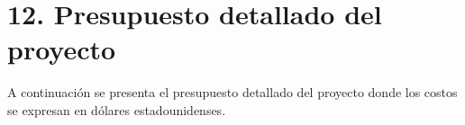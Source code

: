 \documentclass[
11pt, %
]{charter}
\begin{document}
%
%
%
%
%
%
\section{12. Presupuesto detallado del proyecto}
\label{sec:presupuesto}

A continuación se presenta el presupuesto detallado del proyecto donde los costos se expresan en dólares estadounidenses.
\end{document}
